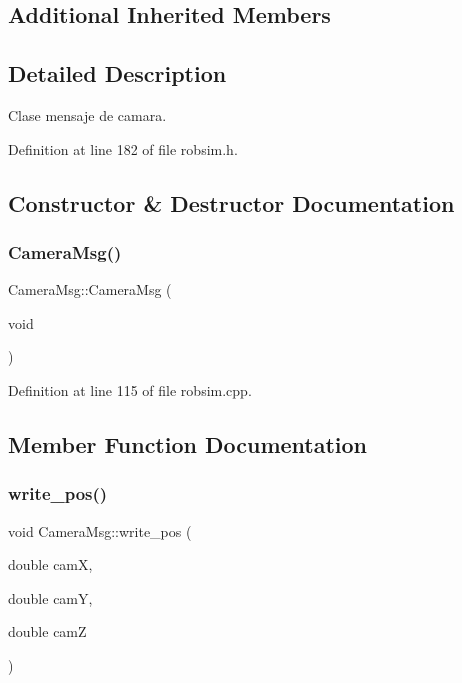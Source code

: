 \subsection*{Additional Inherited Members}


\subsection{Detailed Description}
Clase mensaje de camara. 

Definition at line 182 of file robsim.\+h.



\subsection{Constructor \& Destructor Documentation}
\mbox{\label{classCameraMsg_a5c60f7195b2abc7fdbd2c4568c8708d4}} 
\subsubsection{\texorpdfstring{Camera\+Msg()}{CameraMsg()}}
{\footnotesize\ttfamily Camera\+Msg\+::\+Camera\+Msg (\begin{DoxyParamCaption}\item[{void}]{ }\end{DoxyParamCaption})}



Definition at line 115 of file robsim.\+cpp.



\subsection{Member Function Documentation}
\mbox{\label{classCameraMsg_a533eef67ac13dabdb81969eff6aaa267}} 
\subsubsection{\texorpdfstring{write\+\_\+pos()}{write\_pos()}}
{\footnotesize\ttfamily void Camera\+Msg\+::write\+\_\+pos (\begin{DoxyParamCaption}\item[{double}]{camX,  }\item[{double}]{camY,  }\item[{double}]{camZ }\end{DoxyParamCaption})}



